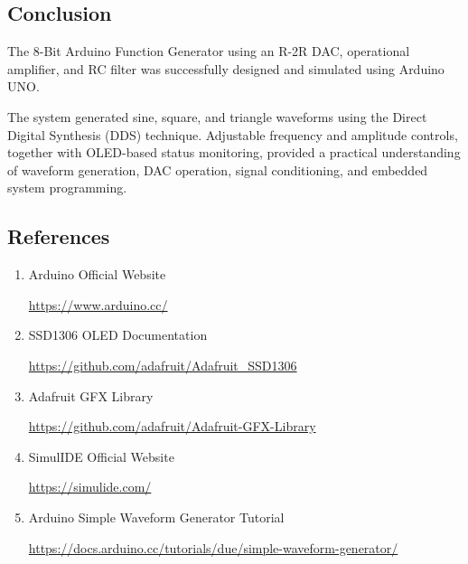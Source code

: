 
\subsection{Conclusion}

The 8-Bit Arduino Function Generator using an R-2R DAC, operational amplifier, and RC filter was successfully designed and simulated using Arduino UNO.

The system generated sine, square, and triangle waveforms using the Direct Digital Synthesis (DDS) technique. Adjustable frequency and amplitude controls, together with OLED-based status monitoring, provided a practical understanding of waveform generation, DAC operation, signal conditioning, and embedded system programming.


\subsection{References}

\begin{enumerate}

\item Arduino Official Website

\url{https://www.arduino.cc/}

\item SSD1306 OLED Documentation

\url{https://github.com/adafruit/Adafruit_SSD1306}

\item Adafruit GFX Library

\url{https://github.com/adafruit/Adafruit-GFX-Library}

\item SimulIDE Official Website

\url{https://simulide.com/}

\item Arduino Simple Waveform Generator Tutorial

\url{https://docs.arduino.cc/tutorials/due/simple-waveform-generator/}

\end{enumerate}


\clearpage

